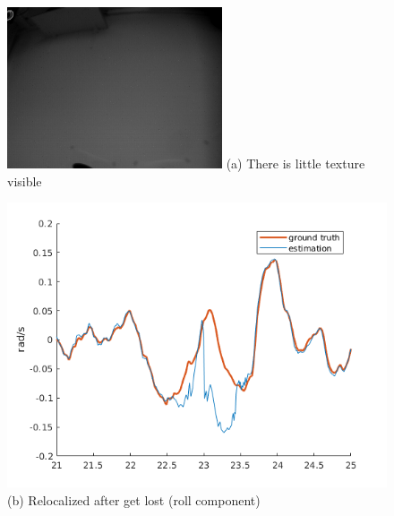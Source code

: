 \begin{figure}
  \begin{minipage}[t]{0.48\textwidth}
    \centering \includegraphics[width =
    \textwidth]{images/frame_00000520.png} (a) There is little texture
    visible
  \end{minipage}
  \hfill
  \begin{minipage}[t]{0.48\textwidth}
    \centering \includegraphics[width =
    \textwidth]{images/shapes_tr_lost.png} (b) Relocalized after get
    lost (roll component)
  \end{minipage}


\end{figure}
